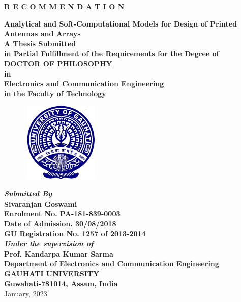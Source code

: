 \documentclass[]{ectguthesis}
\begin{document}
%
\begin{titlepage}
\begin{center}
{\large \textbf{R E C O M M E N D A T I O N} }
\vspace{0.3in}

{\Large \bf Analytical and Soft-Computational Models for Design of Printed Antennas and Arrays} \\ [2ex]
{\normalsize{ \textbf{A Thesis Submitted \\in
 Partial Fulfillment of the Requirements for the Degree of \\\large \bf
DOCTOR OF PHILOSOPHY\\
in \\
Electronics and Communication Engineering \\
in the Faculty of Technology}}}\\
[2ex]

\begin{figure}[h]
\centering
\includegraphics[width=1.5in,height=1.5in]{clogoe.eps}\\
\end{figure}

{\sl \textbf{Submitted By}} \\[2ex]
{\sf \sf \textbf{Sivaranjan Goswami\\
Enrolment No. PA-181-839-0003\\
Date of Admission. 30/08/2018\\
GU Registration No. 1257 of 2013-2014}}\\[4ex]
{\sl \textbf{Under the supervision of}} \\[1ex]
{\sf \sf \textbf{Prof. Kandarpa Kumar Sarma}}\\ [3ex]

{\large \bf Department of Electronics and Communication Engineering}  \\[1ex]
{\large \bf{GAUHATI UNIVERSITY}} \\[1ex]
{\large \bf{Guwahati-781014, Assam, India}} \\[1ex]
{\normalsize January, 2023}
\end{center}
\end{titlepage}
\pagebreak
{}
\end{document}
